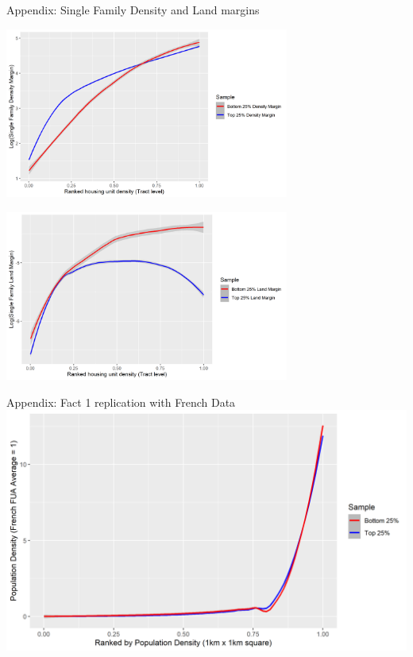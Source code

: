 \documentclass{beamer}
\theoremstyle{plain}
\begin{document}
\begin{frame}{Appendix: Single Family Density and Land margins \hyperlink{return}{} }
	\label{2}
	\centerline{\includegraphics[width=0.7\textwidth, height=0.5\textheight]{SingleFamilyDensity.png}}
	\centerline{\includegraphics[width=0.7\textwidth, height=0.5\textheight]{SingleFamilyLand.png}}

\end{frame}


\begin{frame}{Appendix: Fact 1 replication with French Data \hyperlink{return}{} }
	\label{3}
	\includegraphics[width=\textwidth]{tractdens_dist_france.png}

\end{frame}


\end{document}
